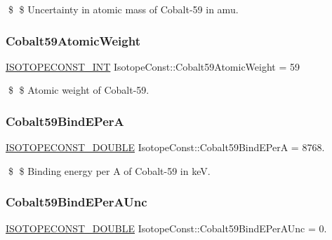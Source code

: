 \$ \$ Uncertainty in atomic mass of Cobalt-\/59 in amu. \mbox{\label{group___isotope_const-_cobalt-_co59_gaef8c9a4df412eab0c7185968911ff724}} 
\subsubsection{\texorpdfstring{Cobalt59\+Atomic\+Weight}{Cobalt59AtomicWeight}}
{\footnotesize\ttfamily \mbox{\hyperlink{group___isotope_const-_macros_ga5f18360b3e99483a35c32d789e62621c}{I\+S\+O\+T\+O\+P\+E\+C\+O\+N\+S\+T\+\_\+\+I\+NT}} Isotope\+Const\+::\+Cobalt59\+Atomic\+Weight = 59}

\$ \$ Atomic weight of Cobalt-\/59. \mbox{\label{group___isotope_const-_cobalt-_co59_gaaecd2eb128718accd06e27197f43f9cf}} 
\subsubsection{\texorpdfstring{Cobalt59\+Bind\+E\+PerA}{Cobalt59BindEPerA}}
{\footnotesize\ttfamily \mbox{\hyperlink{group___isotope_const-_macros_ga8f45a7272ce02c0b4c65c44636ed719a}{I\+S\+O\+T\+O\+P\+E\+C\+O\+N\+S\+T\+\_\+\+D\+O\+U\+B\+LE}} Isotope\+Const\+::\+Cobalt59\+Bind\+E\+PerA = 8768.}

\$ \$ Binding energy per A of Cobalt-\/59 in keV. \mbox{\label{group___isotope_const-_cobalt-_co59_ga1fab2361cddc0f823bba663a768b7098}} 
\subsubsection{\texorpdfstring{Cobalt59\+Bind\+E\+Per\+A\+Unc}{Cobalt59BindEPerAUnc}}
{\footnotesize\ttfamily \mbox{\hyperlink{group___isotope_const-_macros_ga8f45a7272ce02c0b4c65c44636ed719a}{I\+S\+O\+T\+O\+P\+E\+C\+O\+N\+S\+T\+\_\+\+D\+O\+U\+B\+LE}} Isotope\+Const\+::\+Cobalt59\+Bind\+E\+Per\+A\+Unc = 0.}

